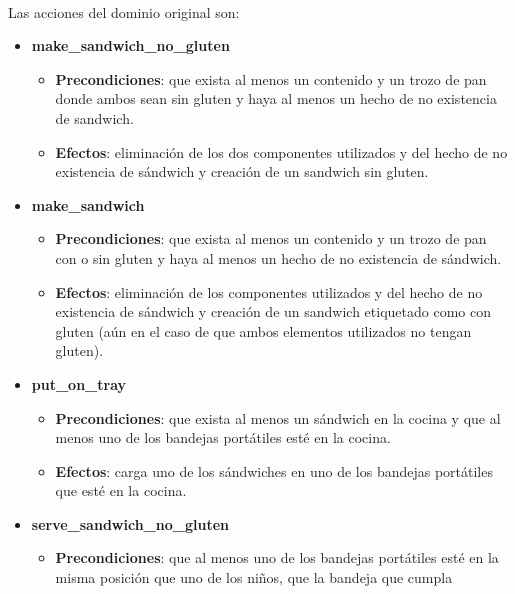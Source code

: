 \documentclass{article}
\begin{document}
\paragraph{}
Las acciones del dominio original son:
\begin{itemize}
    \item \textbf{make\_sandwich\_no\_gluten}
        \begin{itemize}
            \item \textbf{Precondiciones}: que exista al menos un contenido y un trozo de
            pan donde ambos sean sin gluten y haya al menos un hecho de no
            existencia de sandwich. 
            \item \textbf{Efectos}: eliminación de los dos componentes utilizados y del hecho
            de no existencia de sándwich y creación de un sandwich sin gluten.
        \end{itemize}
    \item \textbf{make\_sandwich}
        \begin{itemize}
            \item \textbf{Precondiciones}: que exista al menos un contenido y un trozo de
            pan con o sin gluten y haya al menos un hecho de no existencia de
            sándwich.
            \item \textbf{Efectos}: eliminación de los componentes utilizados y del hecho de no
            existencia de sándwich y creación de un sandwich etiquetado como
            con gluten (aún en el caso de que ambos elementos utilizados no
            tengan gluten).
        \end{itemize}
    \item \textbf{put\_on\_tray}
        \begin{itemize}
            \item \textbf{Precondiciones}: que exista al menos un sándwich en la cocina y
            que al menos uno de los bandejas portátiles esté en la cocina.
            \item \textbf{Efectos}: carga uno de los sándwiches en uno de los bandejas
            portátiles que esté en la cocina.
        \end{itemize}
    \item \textbf{serve\_sandwich\_no\_gluten}
        \begin{itemize}
            \item \textbf{Precondiciones}: que al menos uno de los bandejas portátiles esté
            en la misma posición que uno de los niños, que la bandeja que cumpla

\end{itemize}
\end{itemize}
\end{document}
